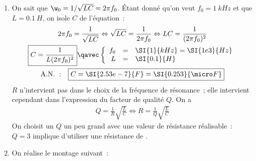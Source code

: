 \documentclass[a4paper, 11pt, final, garamond]{book}
\begin{document}
\begin{enumerate}[label=\sqenumi]
    \item On sait que $\w_0 = 1/\sqrt{LC} = 2\pi f_0$. Étant donné qu'on veut
        $f_0 = \SI{1}{kHz}$ et que $L = \SI{0.1}{H}$, on isole $C$ de
        l'équation~:
        \begin{gather*}
            2\pi f_0 = \frac{1}{\sqrt{LC}}
            \Leftrightarrow
            \sqrt{LC} = \frac{1}{2\pi f_0}
            \Leftrightarrow
            LC = \frac{1}{(2\pi f_0)^2}\\
            \boxed{
                C = \frac{1}{L(2\pi f_0)^2}
            }
            \qavec
            \left\{
                \begin{array}{rcl}
                    f_0 & = & \SI{1}{kHz} = \SI{1e3}{Hz}\\
                    L & = & \SI{0.1}{H}
                \end{array}
            \right.\\
            \mathrm{A.N.~:}\quad
            \boxed{
                C = \SI{2.53e-7}{F} = \SI{0.253}{\micro F}}
        \end{gather*}
        $R$ n'intervient pas dans le choix de la fréquence de résonance~; elle
        intervient cependant dans l'expression du facteur de qualité $Q$. On a
        \begin{gather*}
            Q = \frac{1}{R} \sqrt{\frac{L}{C}}
            \Leftrightarrow
            \boxed{R = \frac{1}{Q} \sqrt{\frac{L}{C}}}
        \end{gather*}
        On choisit un $Q$ un peu grand avec une valeur de résistance
        réalisable~: $Q = 3$ implique d'utiliser une résistance de
        .
    \item On réalise le montage suivant~:


\end{enumerate}
\end{document}
